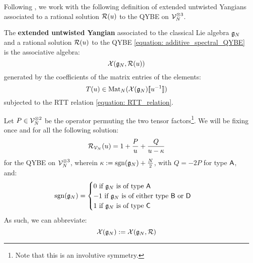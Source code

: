         Following \cite[Definition 2.1]{guay_regelskis_twisted_yangians_for_symmetric_pairs_of_types_BCD}, we work with the following definition of extended untwisted Yangians associated to a rational solution $\mathcal{R}(u)$ to the QYBE on $\calV_N^{\tensor 3}$.
        \begin{definition} \label{def: extended_untwisted_yangians}
            The \textbf{extended untwisted Yangian} associated to the classical Lie algebra $\mathfrak{g}_N$ and a rational solution $\mathcal{R}(u)$ to the QYBE \eqref{equation: additive_spectral_QYBE} is the associative algebra:
                $$\mathcal{X}(\mathfrak{g}_N, \mathcal{R}(u))$$
            generated by the coefficients of the matrix entries of the elements:
                $$T(u) \in \operatorname{Mat}_N( \mathcal{X}(\mathfrak{g}_N)[\![u^{-1}]\!] )$$
            subjected to the RTT relation \eqref{equation: RTT_relation}.
        \end{definition}

        Let $P \in \calV_N^{\tensor 2}$ be the operator permuting the two tensor factors\footnote{Note that this is an involutive symmetry.}. We will be fixing once and for all the following solution:
            $$\mathcal{R}_{\mathcal{V}_N}(u) = 1 + \frac{P}{u} + \frac{Q}{u - \kappa}$$
        for the QYBE on $\calV_N^{\tensor 3}$, wherein $\kappa := \operatorname{sgn}(\mathfrak{g}_N) + \frac{N}{2}$, with $Q = -2P$ for type $\mathsf{A}$, and:
            \begin{equation} \label{equation: BCD_signature}
                \operatorname{sgn}(\mathfrak{g}_N) =
                \begin{cases}
                    \text{$0$ if $\mathfrak{g}_N$ is of type $\mathsf{A}$}
                    \\
                    \text{$-1$ if $\mathfrak{g}_N$ is of either type $\mathsf{B}$ or $\mathsf{D}$}
                    \\
                    \text{$1$ if $\mathfrak{g}_N$ is of type $\mathsf{C}$}
                \end{cases}
            \end{equation}
        As such, we can abbreviate:
            $$\mathcal{X}(\mathfrak{g}_N) := \mathcal{X}(\mathfrak{g}_N, \mathcal{R})$$

